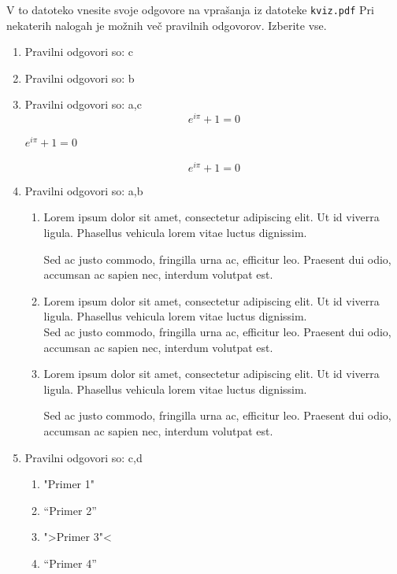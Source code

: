 \documentclass[11pt]{article}
\begin{document}
V to datoteko vnesite svoje odgovore na vprašanja iz datoteke \texttt{kviz.pdf}
Pri nekaterih nalogah je možnih več pravilnih odgovorov. Izberite vse.

\begin{enumerate}
    \item Pravilni odgovori so: c%
    
    \item Pravilni odgovori so: b%
    
    \item Pravilni odgovori so: a,c%
      \[ e^{i \pi} + 1 = 0 \]
      \begin{center}
          \( e^{i \pi} + 1 = 0 \)
      \end{center}
      \begin{equation*}
          e^{i \pi} + 1 = 0
      \end{equation*}

    \item Pravilni odgovori so: a,b%
        \begin{enumerate}
            \item {
Lorem ipsum dolor sit amet, consectetur adipiscing 
elit. Ut id viverra ligula. Phasellus vehicula lorem 
vitae luctus dignissim. 
                
Sed ac justo commodo, fringilla urna ac, efficitur 
leo. Praesent dui odio, accumsan ac sapien nec, 
interdum volutpat est. 
            }
            \item {
Lorem ipsum dolor sit amet, consectetur adipiscing 
elit. Ut id viverra ligula. Phasellus vehicula lorem 
vitae luctus dignissim. \\
Sed ac justo commodo, fringilla urna ac, efficitur 
leo. Praesent dui odio, accumsan ac sapien nec, 
interdum volutpat est.             }
            \item {
Lorem ipsum dolor sit amet, consectetur adipiscing 
elit. Ut id viverra ligula. Phasellus vehicula lorem 
vitae luctus dignissim. \par
Sed ac justo commodo, fringilla urna ac, efficitur 
leo. Praesent dui odio, accumsan ac sapien nec, 
interdum volutpat est.             }
        \end{enumerate}
    
      \item Pravilni odgovori so: c,d%
        \begin{enumerate}
          \item "Primer 1"
          \item ``Primer 2''
          \item ">Primer 3"<
          \item "`Primer 4"'
        \end{enumerate}


\end{enumerate}
\end{document}
